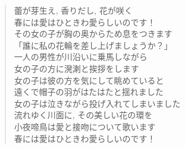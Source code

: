 \begin{quote}
\begin{multicols}{2}
	蕾が芽生え, 香りだし, 花が咲く\\
	春には愛はひときわ愛らしいのです！ \\
	その女の子が胸の奥からため息をつきます \\
	「誰に私の花輪を差し上げましょうか？」\\

	一人の男性が川沿いに乗馬しながら \\
	女の子の方に溌溂と挨拶をします\\
	女の子は彼の方を気にして眺めていると \\
	遠くで帽子の羽がはたはたと揺れました \\

	女の子は泣きながら投げ入れてしまいました \\
	流れゆく川面に, その美しい花の環を \\
	小夜啼鳥は愛と接吻について歌います \\
	春には愛はひときわ愛らしいのです！
\end{multicols}
\end{quote}

